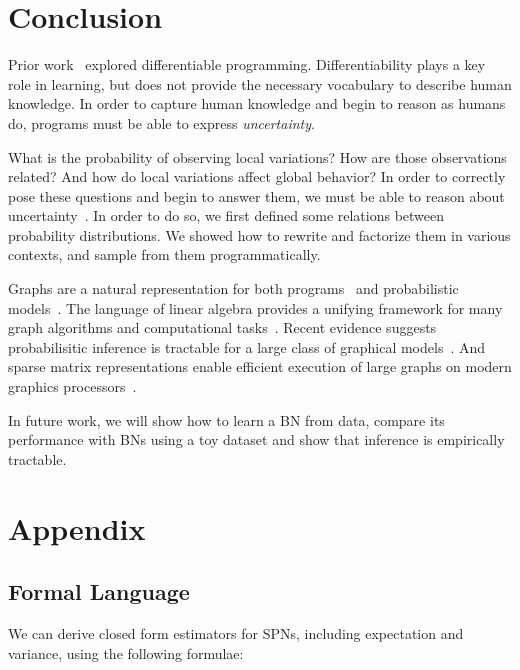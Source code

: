 \documentclass{article}
\begin{document}
\section{Conclusion}

Prior work~\citep{considine2019kotlingrad,considine2019programming} explored differentiable programming. Differentiability plays a key role in learning, but does not provide the necessary vocabulary to describe human knowledge. In order to capture human knowledge and begin to reason as humans do, programs must be able to express \textit{uncertainty}.

What is the probability of observing local variations? How are those observations related? And how do local variations affect global behavior? In order to correctly pose these questions and begin to answer them, we must be able to reason about uncertainty~\citep{pearl2014probabilistic}. In order to do so, we first defined some relations between probability distributions. We showed how to rewrite and factorize them in various contexts, and sample from them programmatically.

Graphs are a natural representation for both programs~\citep{allamanis2017learning} and probabilistic models~\citep{pearl2014probabilistic}. The language of linear algebra provides a unifying framework for many graph algorithms and computational tasks~\citep{kepner2011graph}. Recent evidence suggests probabilisitic inference is tractable for a large class of graphical models~\citep{choi2020probabilistic}. And sparse matrix representations enable efficient execution of large graphs on modern graphics processors~\citep{kepner2016mathematical}.

In future work, we will show how to learn a BN from data, compare its performance with BNs using a toy dataset and show that inference is empirically tractable.




\section{Appendix}\label{sec:appendix}

\subsection{Formal Language}

We can derive closed form estimators for SPNs, including expectation and variance, using the following formulae:
\end{document}
